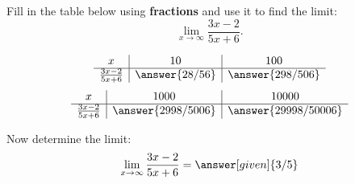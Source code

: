 \documentclass{ximera}
\begin{document}
\begin{problem}[problem 10]
Fill in the table below using \textbf{fractions} and use it to find the limit:
\[\lim_{x \to \infty} \frac{3x-2}{5x+6}.\]

\begin{prompt}
\begin{center}
\[
\begin{array}{ c | c | c }
  x & 10 & 100   \\ 
	\hline 
	 \frac{3x-2}{5x+6} & \answer{28/56} & \answer{298/506} 
\end{array}
\]
\[
\begin{array}{ c | c | c  }
  x  & 1000 & 10000 \\ 
	\hline 
	 \frac{3x-2}{5x+6}  & \answer{2998/5006} & \answer{29998/50006}
\end{array}
\]
\end{center}
Now determine the limit:
\[
\lim_{x \to \infty} \frac{3x-2}{5x+6} = \answer[given]{3/5}
\]
\end{prompt}
\end{problem}
\end{document}
